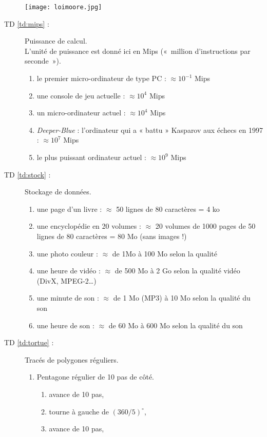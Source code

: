 \begin{description}
{\begin{rem}
	\centerline{\texttt{[image: loimoore.jpg]}}
	\end{rem}
	}
\item[TD \ref{td:mips} :] Puissance de calcul.\\
	L'unité de puissance est donné ici en Mips («~million d'instructions par
	seconde~»).
	\begin{enumerate}
	\item le premier micro-ordinateur de type PC : $\approx 10^{-1}$ Mips
	\item une console de jeu actuelle : $\approx 10^{4}$ Mips
	\item un micro-ordinateur actuel : $\approx 10^{4}$ Mips
	\item {\em Deeper-Blue} : l'ordinateur qui a « battu » Kasparov aux 
		échecs en 1997 : $\approx 10^{7}$ Mips
	\item le plus puissant ordinateur actuel : $\approx 10^{9}$ Mips
	\end{enumerate}
\item[TD \ref{td:stock} :] Stockage de données.
	\begin{enumerate}
	\item une page d'un livre : $\approx$ 50 lignes de 80 caractères = 4 ko
	\item une encyclopédie en 20 volumes : $\approx$ 20 volumes de 1000
	pages de 50 lignes de 80 caractères = 80 Mo (sans images !)
	\item une photo couleur : $\approx$ de 1Mo à 100 Mo selon la qualité
	\item une heure de vidéo : $\approx$ de 500 Mo à 2 Go 
		selon la qualité vidéo (DivX, MPEG-2\ldots)
	\item une minute de son : $\approx$ de 1 Mo (MP3) à 10 Mo 
		selon la qualité du son
	\item une heure de son : $\approx$ de 60 Mo à 600 Mo 
		selon la qualité du son
	\end{enumerate}
\newpage
\item[TD \ref{td:tortue} :] Tracés de polygones réguliers.
	\begin{enumerate}
	\item Pentagone régulier de 10 pas de côté.\\
		\begin{minipage}{6cm}
		\begin{enumerate}
		\item avance de 10 pas,
		\item tourne à gauche de $(360/5)^\circ$,
		\item avance de 10 pas,

\end{enumerate}
\end{minipage}
\end{enumerate}
\end{description}
